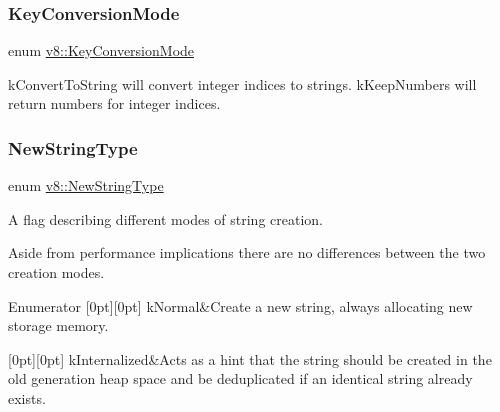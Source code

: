 \subsubsection{\texorpdfstring{Key\+Conversion\+Mode}{KeyConversionMode}}
{\footnotesize\ttfamily enum \mbox{\hyperlink{namespacev8_aa65aeff871614520d8033dead4b34e38}{v8\+::\+Key\+Conversion\+Mode}}\hspace{0.3cm}{\ttfamily [strong]}}

k\+Convert\+To\+String will convert integer indices to strings. k\+Keep\+Numbers will return numbers for integer indices. \mbox{\label{namespacev8_ac9163ab12fb3b2a95907a3a0367c6095}} 
\subsubsection{\texorpdfstring{New\+String\+Type}{NewStringType}}
{\footnotesize\ttfamily enum \mbox{\hyperlink{namespacev8_ac9163ab12fb3b2a95907a3a0367c6095}{v8\+::\+New\+String\+Type}}\hspace{0.3cm}{\ttfamily [strong]}}

A flag describing different modes of string creation.

Aside from performance implications there are no differences between the two creation modes. \begin{DoxyEnumFields}{Enumerator}
[0pt][0pt]{}\mbox{\label{namespacev8_ac9163ab12fb3b2a95907a3a0367c6095a07fa7a19aa722c635a15e94cb7f50416}} 
k\+Normal&Create a new string, always allocating new storage memory. \\
\hline

[0pt][0pt]{}\mbox{\label{namespacev8_ac9163ab12fb3b2a95907a3a0367c6095ade6a7f11cd845d59e52b388d18929295}} 
k\+Internalized&Acts as a hint that the string should be created in the old generation heap space and be deduplicated if an identical string already exists. \\
\hline

\end{DoxyEnumFields}
\mbox{\label{namespacev8_a05f25f935e108a1ea2d150e274602b87}} 
